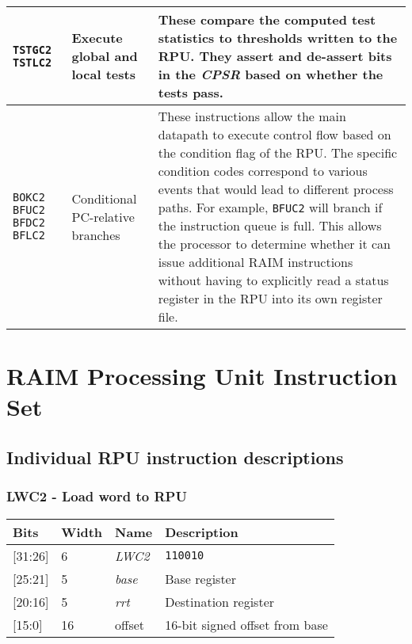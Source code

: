 \documentclass[11pt]{article}
\begin{document}
\begin{table}[H]
\begin{tabular}{|m{2.5cm}|m{4cm}|m{10cm}|}
    \texttt{TSTGC2} \newline \texttt{TSTLC2} & Execute global and local tests & These compare the computed test statistics to thresholds written to the RPU. They assert and de-assert bits in the \emph{CPSR} based on whether the tests pass.\\ \hline

    \texttt{BOKC2} \newline \texttt{BFUC2} \newline \texttt{BFDC2} \newline \texttt{BFLC2} & Conditional PC-relative branches & These instructions allow the main datapath to execute control flow based on the condition flag of the RPU. The specific condition codes correspond to various events that would lead to different process paths. For example, \texttt{BFUC2} will branch if the instruction queue is full. This allows the processor to determine whether it can issue additional RAIM instructions without having to explicitly read a status register in the RPU into its own register file.\\ \hline
  \end{tabular}
\end{table}

\section{RAIM Processing Unit Instruction Set}

\subsection{Individual RPU instruction descriptions}

\text{}
\subsubsection{LWC2 - Load word to RPU}
\text{}

\begin{table}[H] \centering
  \def\arraystretch{1.4}
  \begin{tabular}{|m{2cm}|m{1.5cm}|m{2.5cm}|m{4.5cm}|}
    \hline
    \textbf{Bits} & \textbf{Width} & \textbf{Name} & \textbf{Description}\\ \hline

    [31:26] & 6 & \emph{LWC2} & \texttt{110010}\\ \hline

    [25:21] & 5 & \emph{base} & Base register\\ \hline

    [20:16] & 5 & \emph{rrt} & Destination register\\ \hline

    [15:0] & 16 & offset & 16-bit signed offset from base\\ \hline
  \end{tabular}
\end{table}
\end{document}

